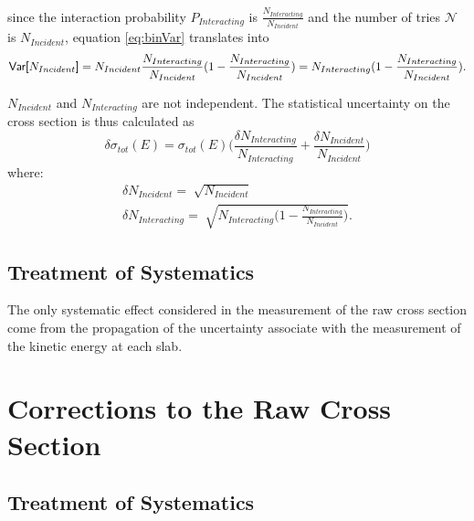 since the interaction probability $P_{Interacting}$ is $\frac{ N_{Interacting}}{N_{Incident}}$ and the number of tries $\mathcal{N}$ is $N_{Incident}$, equation \ref{eq:binVar} translates into
\begin{equation}
\text{\textsf{Var[$N_{Incident}$]}} = N_{Incident}\frac{ N_{Interacting}}{N_{Incident}} (1-\frac{ N_{Interacting}}{N_{Incident}}) = N_{Interacting}(1-\frac{ N_{Interacting}}{N_{Incident}}). 
\end{equation}

$N_{Incident}$ and $N_{Interacting}$ are not independent.
The statistical uncertainty on the cross section is thus calculated as 
\begin{equation}
\delta\sigma_{tot}(E) = \sigma_{tot}(E) \Big(\frac{\delta N_{Interacting}}{N_{Interacting}}+\frac{\delta N_{Incident}}{N_{Incident}}\Big) 
\end{equation}
where:
\begin{eqnarray}
\delta N_{Incident} = \sqrt[]{N_{Incident}} \\
\delta N_{Interacting} = \sqrt[]{N_{Interacting}\Big(1-\frac{ N_{Interacting}}{N_{Incident}}\Big)}.
\end{eqnarray}



\subsection{Treatment of Systematics} \label{ch:SysUncertaintyXSRaw}
The only systematic effect considered in the measurement of the raw cross section come from the propagation of the uncertainty associate with the measurement of the kinetic energy at each slab.


\section{Corrections to the Raw Cross Section}\label{ch:PionXSCorrections}
\subsection{Treatment of Systematics}

